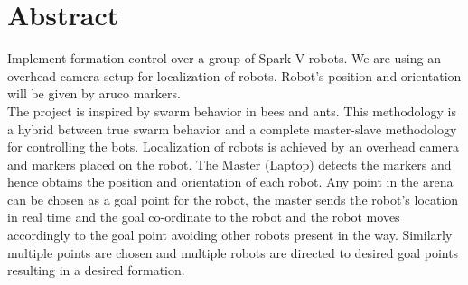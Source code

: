 \documentclass[main.tex]{subfiles}
\begin{document}
\section{Abstract}
Implement formation control over a group of Spark V robots. We are using an overhead camera setup for localization of robots. Robot's position and orientation will be given by aruco markers.\\
The project is inspired by swarm behavior in bees and ants. This methodology is a hybrid between true swarm behavior and a complete master-slave methodology for controlling the bots. Localization of robots is achieved by an overhead camera and markers placed on the robot. The Master (Laptop) detects the markers and hence obtains the position and orientation of each robot. Any point in the arena can be chosen as a goal point for the robot, the master sends the robot's location in real time and the goal co-ordinate to the robot and the robot moves accordingly to the goal point avoiding other robots present in the way. Similarly multiple points are chosen and multiple robots are directed to desired goal points resulting in a desired formation.\\
\end{document}
